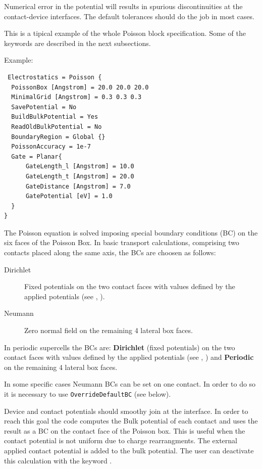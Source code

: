 Numerical error in the potential will results in spurious discontinuities at the
contact-device interfaces. The default tolerances should do the job in most
cases.

This is a tipical example of the whole Poisson block specification. Some of the
keywords are described in the next subsections.


Example:
 
\begin{verbatim}
 Electrostatics = Poisson {
  PoissonBox [Angstrom] = 20.0 20.0 20.0
  MinimalGrid [Angstrom] = 0.3 0.3 0.3
  SavePotential = No
  BuildBulkPotential = Yes
  ReadOldBulkPotential = No
  BoundaryRegion = Global {}
  PoissonAccuracy = 1e-7
  Gate = Planar{
      GateLength_l [Angstrom] = 10.0
      GateLength_t [Angstrom] = 20.0
      GateDistance [Angstrom] = 7.0
      GatePotential [eV] = 1.0
  }
}
\end{verbatim}


The Poisson equation is solved imposing special boundary conditions (BC) on the
six faces of the Poisson Box. In basic transport calculations, comprising two
contacts placed along the same axis, the BCs are choosen as follows:

\begin{description}
\item[Dirichlet] Fixed potentials on the two contact faces with values defined
  by the applied potentials (see , ).
\item[Neumann] Zero normal field on the remaining 4 lateral box faces.
\end{description}
In periodic supercells the BCs are: {\bf Dirichlet} (fixed potentials) on the
two contact faces with values defined by the applied potentials (see
, ) and {\bf Periodic} on the remaining
4 lateral box faces.

In some specific cases Neumann BCs can be set on one contact. In order to do so
it is necessary to use \verb|OverrideDefaultBC| (see below).

Device and contact potentials should smoothy join at the interface. In order to
reach this goal the code computes the Bulk potential of each contact and uses
the result as a BC on the contact face of the Poisson box. This is useful when
the contact potential is not uniform due to charge rearrangments. The external
applied contact potential is added to the bulk potential.  The user can
deactivate this calculation with the keyword .

